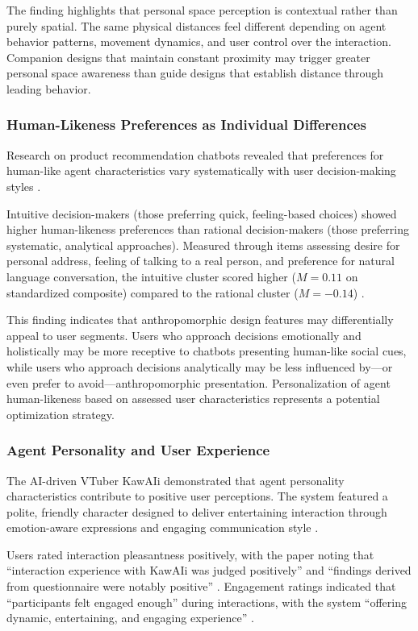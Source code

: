 \documentclass[manuscript,anonymous,sigconf]{acmart}
\begin{document}
The finding highlights that personal space perception is contextual rather than purely spatial. The same physical distances feel different depending on agent behavior patterns, movement dynamics, and user control over the interaction. Companion designs that maintain constant proximity may trigger greater personal space awareness than guide designs that establish distance through leading behavior.

\subsubsection{Human-Likeness Preferences as Individual Differences}

Research on product recommendation chatbots revealed that preferences for human-like agent characteristics vary systematically with user decision-making styles \cite{A42}.

Intuitive decision-makers (those preferring quick, feeling-based choices) showed higher human-likeness preferences than rational decision-makers (those preferring systematic, analytical approaches). Measured through items assessing desire for personal address, feeling of talking to a real person, and preference for natural language conversation, the intuitive cluster scored higher ($M = 0.11$ on standardized composite) compared to the rational cluster ($M = -0.14$) \cite{A42}.

This finding indicates that anthropomorphic design features may differentially appeal to user segments. Users who approach decisions emotionally and holistically may be more receptive to chatbots presenting human-like social cues, while users who approach decisions analytically may be less influenced by---or even prefer to avoid---anthropomorphic presentation. Personalization of agent human-likeness based on assessed user characteristics represents a potential optimization strategy.

\subsubsection{Agent Personality and User Experience}

The AI-driven VTuber KawAIi demonstrated that agent personality characteristics contribute to positive user perceptions. The system featured a polite, friendly character designed to deliver entertaining interaction through emotion-aware expressions and engaging communication style \cite{A81}.

Users rated interaction pleasantness positively, with the paper noting that ``interaction experience with KawAIi was judged positively'' and ``findings derived from questionnaire were notably positive'' \cite{A81}. Engagement ratings indicated that ``participants felt engaged enough'' during interactions, with the system ``offering dynamic, entertaining, and engaging experience'' \cite{A81}.
\end{document}
